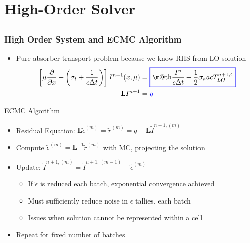 \documentclass[xcolor=dvipsnames,handout,hyperref={pdfpagelabels=false}]{beamer}
\makeatletter
\newcommand*{\boxedcolor}{blue}
\renewcommand{\boxed}[1]{\textcolor{\boxedcolor}{%
  \fbox{\normalcolor\m@th$\displaystyle#1$}}}
\newcommand{\colb}[1]{{\color{blue} #1}}
\newlength{\wideitemsep}
\let\olditem\item
\renewcommand{\item}{\setlength{\itemsep}{\wideitemsep}\olditem}
\newcommand{\pderiv}[2]{\frac{\partial #1}{\partial #2}}
\newcommand{\B}[1]{\ensuremath{\mathbf{#1}}}
\makeatother
\begin{document}
\section{High-Order Solver}
\subsection{}





\begin{frame}
    \frametitle{High Order System and ECMC Algorithm}
    \begin{itemize}
        \item \colb{Pure absorber} transport problem because we know RHS from LO
            solution
        \begin{align*}
            \left[\mu \pderiv{}{x} + \left(\sigma_t+\frac{1}{c\Delta t}\right)\right]I^{n+1}(x,\mu)
            &= \boxed{\frac{I^{n}}{c\Delta t} + \frac{1}{2}\sigma_a a c T_{LO}^{n+1,4}} \\
            \B L I^{n+1} &= \colb{q}
     \end{align*}
        \vspace{-0.3in}
        \end{itemize}
        \begin{block}{ECMC Algorithm}
         \begin{itemize}
        \item Residual Equation: $\displaystyle \B L \tilde 
            \epsilon^{(m)} =
            \tilde r^{(m)} = q - \B L \tilde I^{n+1,(m)}$
        \item Compute $\tilde{\epsilon}^{(m)} = \B L^{-1} \tilde{r}^{(m)}$ with MC,
            \colb{projecting} the solution  
        \item Update: $\tilde I^{n+1,(m)} = \tilde I^{n+1,(m-1)} + \tilde \epsilon^{(m)}$
        \begin{itemize}
            \item If $\tilde{\epsilon}$ is reduced each batch, \colb{exponential convergence
                achieved}
             \item Must sufficiently reduce noise in $\epsilon$ tallies, each batch
             \item Issues when solution cannot be represented within a cell
        \end{itemize}
    \item Repeat for fixed number of batches
    \end{itemize}
\end{block}
\end{frame}
\end{document}
